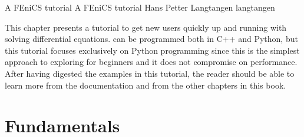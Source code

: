               {A FEniCS tutorial}
              {A FEniCS tutorial}
              {Hans Petter Langtangen}
              {langtangen}

This chapter presents a \fenics{} tutorial to get new users quickly up and
running with solving differential equations. \fenics{} can be programmed
both in C++ and Python, but this tutorial focuses exclusively on Python
programming since this is the simplest approach to exploring \fenics{} for
beginners and it does not compromise on performance. After having digested
the examples in this tutorial, the reader should be able to learn more
from the \fenics{} documentation and from the other chapters in this book.

\section{Fundamentals}
\label{langtangen:fundamentals}

